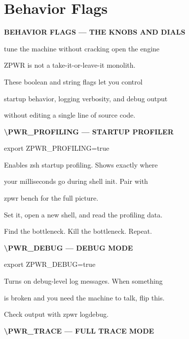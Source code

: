 \documentclass[11pt,a4paper,twoside]{book}
\begin{document}
\section{Behavior Flags}


\vspace{10pt}
{\large\bfseries\color{neoncyan} BEHAVIOR FLAGS — THE KNOBS AND DIALS}\vspace{6pt}

tune the machine without cracking open the engine

ZPWR is not a take-it-or-leave-it monolith.

These boolean and string flags let you control

startup behavior, logging verbosity, and debug output

without editing a single line of source code.


\vspace{12pt}
{\bfseries\color{neonyellow} \textbackslash{}PWR\_PROFILING — STARTUP PROFILER}\vspace{4pt}

export ZPWR\_PROFILING=true

Enables zsh startup profiling. Shows exactly where

your milliseconds go during shell init. Pair with

\begin{codebox}
zpwr bench for the full picture.\\
\end{codebox}

Set it, open a new shell, and read the profiling data.

Find the bottleneck. Kill the bottleneck. Repeat.


\vspace{12pt}
{\bfseries\color{neonyellow} \textbackslash{}PWR\_DEBUG — DEBUG MODE}\vspace{4pt}

export ZPWR\_DEBUG=true

Turns on debug-level log messages. When something

is broken and you need the machine to talk, flip this.

\begin{codebox}
Check output with zpwr logdebug.\\
\end{codebox}


\vspace{12pt}
{\bfseries\color{neonyellow} \textbackslash{}PWR\_TRACE — FULL TRACE MODE}\vspace{4pt}
\end{document}
